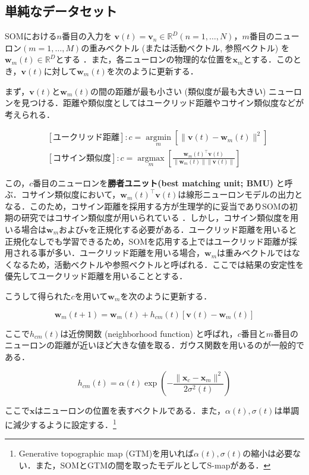 \subsection{単純なデータセット}
SOMにおける$n$番目の入力を $\mathbf{v}(t)=\mathbf{v}_n\in \mathbb{R}^{D} (n=1, \ldots, N)$，$m$番目のニューロン$ (m=1, \ldots, M) $の重みベクトル (または活動ベクトル, 参照ベクトル) を$\mathbf{w}_m(t)\in \mathbb{R}^{D}$とする \cite{Kohonen2013-yt}．また，各ニューロンの物理的な位置を$\mathbf{x}_m$とする．このとき，$\mathbf{v}(t)$に対して$\mathbf{w}_m(t)$を次のように更新する．

まず，$\mathbf{v}(t)$と$\mathbf{w}_m(t)$の間の距離が最も小さい (類似度が最も大きい) ニューロンを見つける．距離や類似度としてはユークリッド距離やコサイン類似度などが考えられる．


\begin{align}
&[\text{ユークリッド距離}]: c = \underset{m}{\operatorname{argmin}}\left[\|\mathbf{v}(t)-\mathbf{w}_m(t)\|^2\right]\\
&[\text{コサイン類似度}]: c  = \underset{m}{\operatorname{argmax}}\left[\frac{\mathbf{w}_m(t)^\top\mathbf{v}(t)}{\|\mathbf{w}_m(t)\|\|\mathbf{v}(t)\|}\right]
\end{align}


この，$c$番目のニューロンを\textbf{勝者ユニット(best matching unit; BMU)} と呼ぶ．コサイン類似度において，$\mathbf{w}_m(t)^\top\mathbf{v}(t)$は線形ニューロンモデルの出力となる．このため，コサイン距離を採用する方が生理学的に妥当でありSOMの初期の研究ではコサイン類似度が用いられている \cite{Kohonen1982-mn}．しかし，コサイン類似度を用いる場合は$\mathbf{w}_m$および$\mathbf{v}$を正規化する必要がある．ユークリッド距離を用いると正規化なしでも学習できるため，SOMを応用する上ではユークリッド距離が採用される事が多い．ユークリッド距離を用いる場合，$\mathbf{w}_m$は重みベクトルではなくなるため，活動ベクトルや参照ベクトルと呼ばれる．ここでは結果の安定性を優先してユークリッド距離を用いることとする．

こうして得られた$c$を用いて$\mathbf{w}_m$を次のように更新する．


\begin{equation}
\mathbf{w}_m(t+1)=\mathbf{w}_m(t)+h_{cm}(t)[\mathbf{v}(t)-\mathbf{w}_m(t)]
\end{equation}


ここで$h_{cm}(t)$は近傍関数 (neighborhood function) と呼ばれ，$c$番目と$m$番目のニューロンの距離が近いほど大きな値を取る．ガウス関数を用いるのが一般的である．


\begin{equation}
h_{cm}(t)=\alpha(t)\exp\left(-\frac{\|\mathbf{x}_c-\mathbf{x}_m\|^2}{2\sigma^2(t)}\right)
\end{equation}


ここで$\mathbf{x}$はニューロンの位置を表すベクトルである．また，$\alpha(t), \sigma(t)$は単調に減少するように設定する．\footnote{Generative topographic map (GTM)を用いれば$\alpha(t), \sigma(t)$の縮小は必要ない．また，SOMとGTMの間を取ったモデルとしてS-mapがある．}

